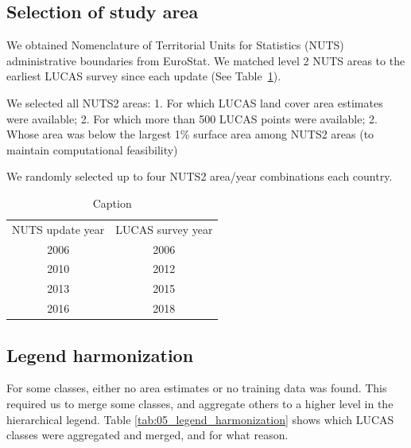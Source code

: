 \subsection{Selection of study area}

We obtained Nomenclature of Territorial Units for Statistics (NUTS) administrative boundaries from EuroStat. %
We matched level 2 NUTS areas to the earliest LUCAS survey since each update (See Table~\ref{tab:05_NUTS_LUCAS}). 

We selected all NUTS2 areas:
1. For which LUCAS land cover area estimates were available;
2. For which more than 500 LUCAS points were available;
2. Whose area was below the largest 1\% surface area among NUTS2 areas (to maintain computational feasibility)

We randomly selected up to four NUTS2 area/year combinations each country.

\begin{table}[H]
    \centering
    \begin{tabular}{c|c}
         NUTS update year &  LUCAS survey year\\
         2006 & 2006 \\
         2010 & 2012 \\
         2013 & 2015 \\
         2016 & 2018 \\
    \end{tabular}
    \caption{Caption}
    \label{tab:05_NUTS_LUCAS}
\end{table}

\subsection{Legend harmonization}
For some classes, either no area estimates or no training data was found. This required us to merge some classes, and aggregate others to a higher level in the hierarchical legend. Table \ref{tab:05_legend_harmonization} shows which LUCAS classes were aggregated and merged, and for what reason.


